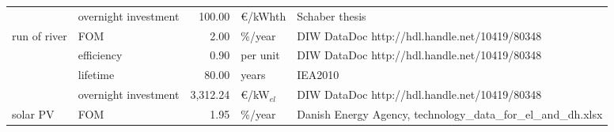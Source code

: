\begin{longtable}{p{4cm}p{4cm}rp{3cm}p{10cm}}
                      & overnight investment &       100.00 &                   \euro/kWhth &                                                                                                                                                                                                                                                                                                                       Schaber thesis \\
run of river & FOM &         2.00 &                       \%/year &                                                                                                                                                                                                                                                                                        DIW DataDoc http://hdl.handle.net/10419/80348 \\
                      & efficiency &         0.90 &                      per unit &                                                                                                                                                                                                                                                                                        DIW DataDoc http://hdl.handle.net/10419/80348 \\
                      & lifetime &        80.00 &                         years &                                                                                                                                                                                                                                                                                                                              IEA2010 \\
                      & overnight investment &     3,312.24 &               \euro/kW$_{el}$ &                                                                                                                                                                                                                                                                                        DIW DataDoc http://hdl.handle.net/10419/80348 \\
solar PV & FOM &         1.95 &                       \%/year &                                                                                                                                                                                                                                                                        Danish Energy Agency, technology\_data\_for\_el\_and\_dh.xlsx \\

\end{longtable}
